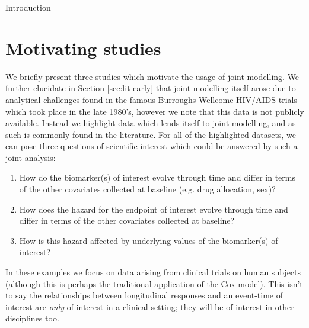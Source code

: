 \begin{chapter}{\label{cha:intro}Introduction}
  \section{\label{sec:studies}Motivating studies}
  We briefly present three studies which motivate the usage of joint modelling. We further elucidate in Section \ref{sec:lit-early} that joint modelling itself arose due to analytical challenges found in the famous Burroughs-Wellcome HIV/AIDS trials which took place in the late 1980's, however we note that this data is not publicly available. Instead we highlight data which lends itself to joint modelling, and as such is commonly found in the literature. For all of the highlighted datasets, we can pose three questions of scientific interest which could be answered by such a joint analysis:
  \begin{enumerate}
      \item How do the biomarker(s) of interest evolve through time and differ in terms of the other covariates collected at baseline (e.g. drug allocation, sex)?
      \item How does the hazard for the endpoint of interest evolve through time and differ in terms of the other covariates collected at baseline?
      \item How is this hazard affected by underlying values of the biomarker(s) of interest?
  \end{enumerate}
   In these examples we focus on data arising from clinical trials on human subjects (although this is perhaps the traditional application of the Cox model). This isn't to say the relationships between longitudinal responses and an event-time of interest are \textit{only} of interest in a clinical setting; they will be of interest in other disciplines too.

\end{chapter}
